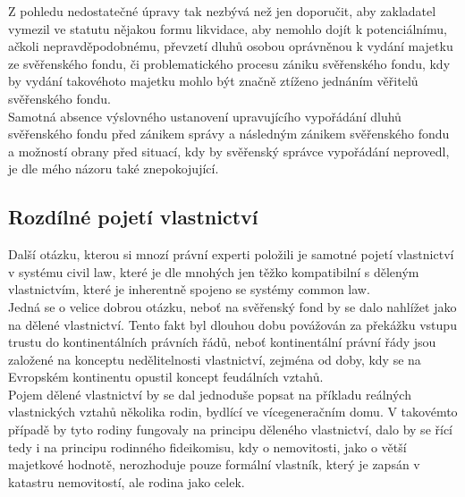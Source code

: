 \documentclass{article}
\begin{document}
Z pohledu nedostatečné úpravy tak nezbývá než jen doporučit, aby zakladatel vymezil ve statutu nějakou formu likvidace, aby nemohlo dojít k potenciálnímu, ačkoli nepravděpodobnému, převzetí dluhů osobou oprávněnou k vydání majetku ze svěřenského fondu, či problematického procesu zániku svěřenského fondu, kdy by vydání takovéhoto majetku mohlo být značně ztíženo jednáním věřitelů svěřenského fondu.\\

Samotná absence výslovného ustanovení upravujícího vypořádání dluhů svěřenského fondu před zánikem správy a následným zánikem svěřenského fondu a možností obrany před situací, kdy by svěřenský správce vypořádání neprovedl, je dle mého názoru také znepokojující.\\





\subsection{Rozdílné pojetí vlastnictví}

Další otázku, kterou si mnozí právní experti položili je samotné pojetí vlastnictví v systému civil law, které je dle mnohých jen těžko kompatibilní s děleným vlastnictvím, které je inherentně spojeno se systémy common law.\\


Jedná se o velice dobrou otázku, neboť na svěřenský fond by se dalo nahlížet jako na dělené vlastnictví. Tento fakt byl dlouhou dobu povážován za překážku vstupu trustu do kontinentálních právních řádů, neboť kontinentální právní řády jsou založené na konceptu nedělitelnosti vlastnictví, zejména od doby, kdy se na Evropském kontinentu opustil koncept feudálních vztahů.\\

Pojem dělené vlastnictví by se dal jednoduše popsat na příkladu reálných vlastnických vztahů několika rodin, bydlící ve vícegeneračním domu. V takovémto případě by tyto rodiny fungovaly na principu děleného vlastnictví, dalo by se řící tedy i na principu rodinného fideikomisu, kdy o nemovitosti, jako o větší majetkové hodnotě, nerozhoduje pouze formální vlastník, který je zapsán v katastru nemovitostí, ale rodina jako celek.\\
\end{document}
